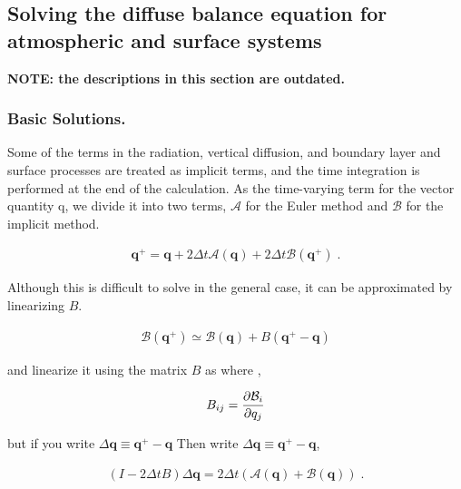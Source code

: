 \hypertarget{solving-the-diffuse-balance-equation-for-atmospheric-and-surface-systems}{%
\subsection{Solving the diffuse balance equation for atmospheric and surface systems}\label{solving-the-diffuse-balance-equation-for-atmospheric-and-surface-systems}}

\textbf{NOTE: the descriptions in this section are outdated.}

\hypertarget{basic-solutions.}{%
\subsubsection{Basic Solutions.}\label{basic-solutions.}}

Some of the terms in the radiation, vertical diffusion, and boundary layer and surface processes are treated as implicit terms, and the time integration is performed at the end of the calculation. As
the time-varying term for the vector quantity {q}, we divide it into two terms, \({\mathcal A}\) for the Euler method and \({\mathcal B}\) for the implicit method.

\begin{eqnarray}
  {\mathbf q}^+
      = {\mathbf q} + 2 \Delta t {\mathcal A}( {\mathbf q}   )
                           + 2 \Delta t {\mathcal B}( {\mathbf q}^+ ) \; .
\end{eqnarray}

Although this is difficult to solve in the general case, it can be approximated by linearizing \(B\).

\begin{eqnarray}
  {\mathcal B}( {\mathbf q}^+ )
                           \simeq {\mathcal B}( {\mathbf q} )
                            + B( {\mathbf q}^+ - {\mathbf q} )
\end{eqnarray}

and linearize it using the matrix \(B\) as where ,

\begin{eqnarray}
  B_{ij} = \frac{\partial{{\cal B}_i}}{\partial {q_j}}
\end{eqnarray}

but if you write \(\Delta {\mathbf q} \equiv {\mathbf q}^+ - {\mathbf q}\) Then write \(\Delta {\mathbf q} \equiv {\mathbf q}^+ - {\mathbf q}\),

\begin{eqnarray}
  ( I - 2 \Delta t B ) \Delta {\mathbf q}
      = 2 \Delta t \left(  {\mathcal A}( {\mathbf q} )
                         + {\mathcal B}( {\mathbf q} ) \right) \; .
\end{eqnarray}

